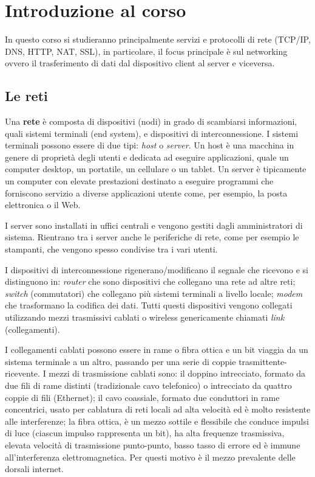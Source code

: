 \chapter{Introduzione al corso}

In questo corso si studieranno principalmente servizi e protocolli di rete (TCP/IP, DNS, HTTP, NAT, SSL), in particolare, il focus principale è sul networking ovvero il trasferimento di dati dal dispositivo client al server e viceversa.

\section{Le reti}

\begin{redbar}
Una \textbf{rete} è composta di dispositivi (nodi) in grado di scambiarsi informazioni, quali sistemi terminali (end system), e dispositivi di interconnessione. I sistemi terminali possono essere di due tipi: \textit{host} o \textit{server}. Un host è una macchina in genere di proprietà degli utenti e dedicata ad eseguire applicazioni, quale un computer desktop, un portatile, un cellulare o un tablet. Un server è tipicamente un computer con elevate prestazioni destinato a eseguire programmi che forniscono servizio a diverse applicazioni utente come, per esempio, la posta elettronica o il Web. 
\end{redbar}

I server sono installati in uffici centrali e vengono gestiti dagli amministratori di sistema. Rientrano tra i server anche le periferiche di rete, come per esempio le stampanti, che vengono spesso condivise tra i vari utenti.

I dispositivi di interconnessione rigenerano/modificano il segnale che ricevono e si distinguono in: \textit{router} che sono dispositivi che collegano una rete ad altre reti; \textit{switch} (commutatori) che collegano più sistemi terminali a livello locale; \textit{modem} che trasformano la codifica dei dati.
Tutti questi dispositivi vengono collegati utilizzando mezzi trasmissivi cablati o wireless genericamente chiamati \textit{link} (collegamenti).

I collegamenti cablati possono essere in rame o fibra ottica e un bit viaggia da un sistema terminale a un altro, passando per una serie di coppie trasmittente-ricevente. I mezzi di trasmissione cablati sono: il doppino intrecciato, formato da due fili di rame distinti (tradizionale cavo telefonico) o intrecciato da quattro coppie di fili (Ethernet); il cavo coassiale, formato due conduttori in rame concentrici, usato per cablatura di reti locali ad alta velocità ed è molto resistente alle interferenze; la fibra ottica, è un mezzo sottile e flessibile che conduce impulsi di luce (ciascun impulso rappresenta un bit), ha alta frequenze trasmissiva, elevata velocità di trasmissione punto-punto, basso tasso di errore ed è immune all'interferenza elettromagnetica. Per questi motivo è il mezzo prevalente delle dorsali internet.

